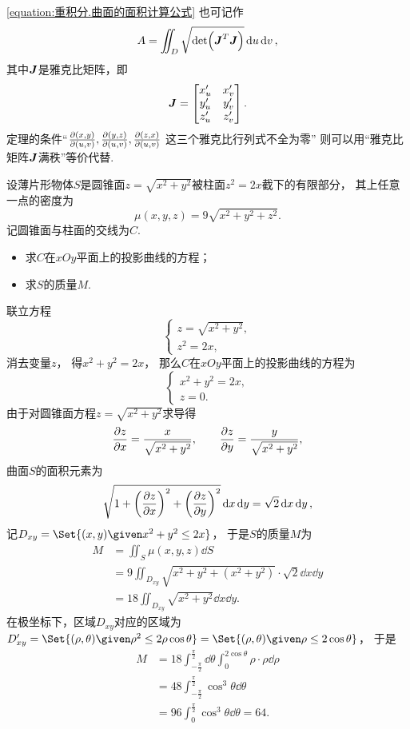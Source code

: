 \cref{equation:重积分.曲面的面积计算公式} 也可记作\[
	A = \iint_D \sqrt{\det(\boldsymbol{J}^T \boldsymbol{J})} \dd{u}\dd{v},
\]
其中\(\boldsymbol{J}\)是雅克比矩阵，即\[
	\boldsymbol{J} = \begin{bmatrix}
		x'_u & x'_v \\
		y'_u & y'_v \\
		z'_u & z'_v
	\end{bmatrix}.
\]
定理的条件“\(\pdv{ (x,y) }{ (u,v) },
\pdv{ (y,z) }{ (u,v) },
\pdv{ (z,x) }{ (u,v) }\)
这三个雅克比行列式不全为零”
则可以用“雅克比矩阵\(\boldsymbol{J}\)满秩”等价代替.


\begin{example}
设薄片形物体\(S\)是圆锥面\(z=\sqrt{x^2+y^2}\)被柱面\(z^2=2x\)截下的有限部分，
其上任意一点的密度为\[
	\mu(x,y,z) = 9\sqrt{x^2+y^2+z^2}.
\]
记圆锥面与柱面的交线为\(C\).
\begin{itemize}
	\item 求\(C\)在\(xOy\)平面上的投影曲线的方程；
	\item 求\(S\)的质量\(M\).
\end{itemize}
\begin{solution}
联立方程\[
	\begin{cases}
		z=\sqrt{x^2+y^2}, \\
		z^2=2x,
	\end{cases}
\]
消去变量\(z\)，
得\(x^2+y^2=2x\)，
那么\(C\)在\(xOy\)平面上的投影曲线的方程为\[
	\begin{cases}
		x^2+y^2=2x, \\
		z=0.
	\end{cases}
\]
由于对圆锥面方程\(z=\sqrt{x^2+y^2}\)求导得\[
	\pdv{z}{x} = \frac{x}{\sqrt{x^2+y^2}},
	\qquad
	\pdv{z}{y} = \frac{y}{\sqrt{x^2+y^2}},
\]
曲面\(S\)的面积元素为\[
	\sqrt{1+\left( \pdv{z}{x} \right)^2+\left( \pdv{z}{y} \right)^2} \dd{x}\dd{y}
	= \sqrt2 \dd{x}\dd{y},
\]
记\(D_{xy} = \Set{ (x,y) \given x^2+y^2\leq2x }\)，
于是\(S\)的质量\(M\)为\begin{align*}
	M &= \iint_S \mu(x,y,z) \dd{S} \\
	&= 9 \iint_{D_{xy}} \sqrt{x^2+y^2+(x^2+y^2)} \cdot \sqrt2 \dd{x}\dd{y} \\
	&= 18 \iint_{D_{xy}} \sqrt{x^2+y^2} \dd{x}\dd{y}.
\end{align*}
在极坐标下，区域\(D_{xy}\)对应的区域为
\(D_{xy}'
= \Set{ (\rho,\theta) \given \rho^2 \leq 2 \rho \cos\theta }
= \Set{ (\rho,\theta) \given \rho \leq 2 \cos\theta }\)，
于是\begin{align*}
	M &= 18 \int_{-\frac\pi2}^{\frac\pi2} \dd\theta
		\int_0^{2\cos\theta} \rho \cdot \rho \dd\rho \\
	&= 48 \int_{-\frac\pi2}^{\frac\pi2} \cos^3\theta \dd\theta \\
	&= 96 \int_0^{\frac\pi2} \cos^3\theta \dd\theta
	= 64.
\end{align*}
\end{solution}
\end{example}

